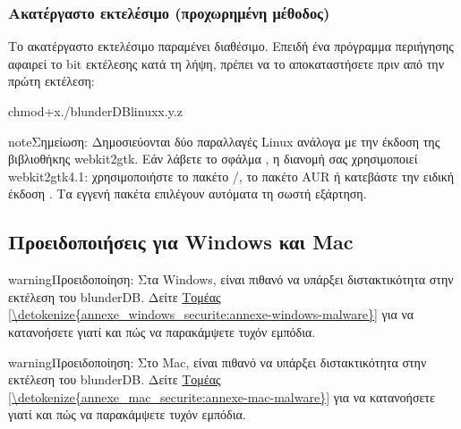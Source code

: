 \documentclass[letterpaper,10pt,greek]{sphinxmanual}
\begin{document}
\subsubsection{Ακατέργαστο εκτελέσιμο (προχωρημένη μέθοδος)}
\label{\detokenize{telecharge_install:binaire-brut-methode-avancee}}
\sphinxAtStartPar
Το ακατέργαστο εκτελέσιμο  παραμένει διαθέσιμο. Επειδή ένα πρόγραμμα περιήγησης αφαιρεί το bit εκτέλεσης κατά τη λήψη, πρέπει να το αποκαταστήσετε πριν από την πρώτη εκτέλεση:

\begin{sphinxVerbatim}[commandchars=\\\{\}]
chmod+x./blunderDB\PYGZhy{}linux\PYGZhy{}x.y.z
\end{sphinxVerbatim}

\begin{sphinxadmonition}{note}{Σημείωση:}
\sphinxAtStartPar
Δημοσιεύονται δύο παραλλαγές Linux ανάλογα με την έκδοση της βιβλιοθήκης webkit2gtk. Εάν λάβετε το σφάλμα , η διανομή σας χρησιμοποιεί webkit2gtk\sphinxhyphen{}4.1: χρησιμοποιήστε το πακέτο /, το πακέτο AUR ή κατεβάστε την ειδική έκδοση . Τα εγγενή πακέτα επιλέγουν αυτόματα τη σωστή εξάρτηση.
\end{sphinxadmonition}


\subsection{Προειδοποιήσεις για Windows και Mac}
\label{\detokenize{telecharge_install:avertissements-windows-et-mac}}
\begin{sphinxadmonition}{warning}{Προειδοποίηση:}
\sphinxAtStartPar
Στα Windows, είναι πιθανό να υπάρξει διστακτικότητα στην εκτέλεση του blunderDB. Δείτε \hyperref[\detokenize{annexe_windows_securite:annexe-windows-malware}]{Τομέας \ref{\detokenize{annexe_windows_securite:annexe-windows-malware}}} για να κατανοήσετε γιατί και πώς να παρακάμψετε τυχόν εμπόδια.
\end{sphinxadmonition}

\begin{sphinxadmonition}{warning}{Προειδοποίηση:}
\sphinxAtStartPar
Στο Mac, είναι πιθανό να υπάρξει διστακτικότητα στην εκτέλεση του blunderDB. Δείτε \hyperref[\detokenize{annexe_mac_securite:annexe-mac-malware}]{Τομέας \ref{\detokenize{annexe_mac_securite:annexe-mac-malware}}} για να κατανοήσετε γιατί και πώς να παρακάμψετε τυχόν εμπόδια.
\end{sphinxadmonition}
\end{document}
